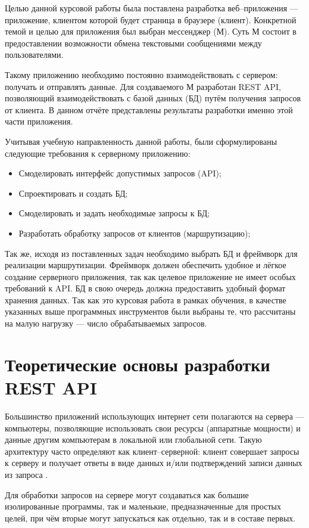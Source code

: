 \documentclass[14pt,final]{report}
\begin{document}
Целью данной курсовой работы была поставлена разработка веб--приложения --- приложение, клиентом которой будет страница в браузере (клиент). Конкретной темой и целью для приложения был выбран мессенджер (М). Суть М состоит в предоставлении возможности обмена текстовыми сообщениями между пользователями.

Такому приложению необходимо постоянно взаимодействовать с сервером: получать и отправлять данные. Для создаваемого М разработан REST API, позволяющий взаимодействовать с базой данных (БД) путём получения запросов от клиента. В данном отчёте представлены результаты разработки именно этой части приложения.

Учитывая учебную направленность данной работы, были сформулированы следующие требования к серверному приложению:
\begin{itemize}
    \item Смоделировать интерфейс допустимых запросов (API);
    \item Спроектировать и создать БД;
    \item Смоделировать и задать необходимые запросы к БД;
    \item Разработать обработку запросов от клиентов (маршрутизацию);
\end{itemize}

Так же, исходя из поставленных задач необходимо выбрать БД и фреймворк для реализации маршрутизации. Фреймворк должен обеспечить удобное и лёгкое создание серверного приложения, так как целевое приложение не имеет особых требований к API. БД в свою очередь должна предоставить удобный формат хранения данных. Так как это курсовая работа в рамках обучения, в качестве указанных выше программных инструментов были выбраны те, что рассчитаны на малую нагрузку --- число обрабатываемых запросов.

\chapter{Теоретические основы разработки REST API}

Большинство приложений использующих интернет сети полагаются на сервера --- компьютеры, позволяющие использовать свои ресурсы (аппаратные мощности) и данные другим компьютерам в локальной или глобальной сети. Такую архитектуру часто определяют как клиент--серверной: клиент совершает запросы к серверу и получает ответы в виде данных и/или подтверждений записи данных из запроса \cite{snaider}.

Для обработки запросов на сервере могут создаваться как большие изолированные программы, так и маленькие, предназначенные для простых целей, при чём вторые могут запускаться как отдельно, так и в составе первых.
\end{document}
